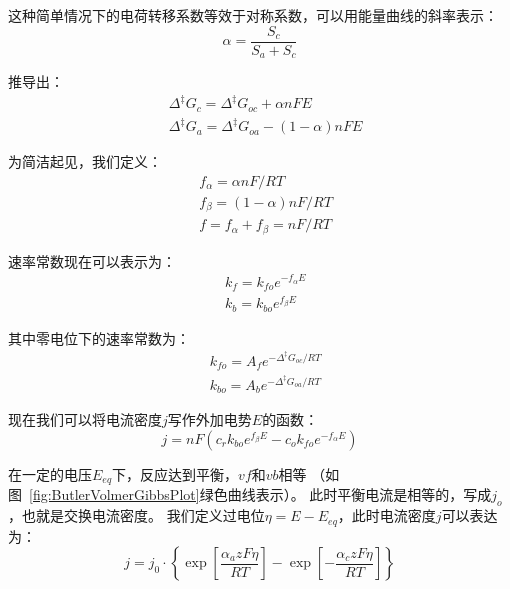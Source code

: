 这种简单情况下的电荷转移系数等效于对称系数，可以用能量曲线的斜率表示：
\begin{equation}
    \alpha=\frac{S_ {c}}{S_ {a} + S_ {c}}
\end{equation}

推导出：
\begin{equation}
    \begin{aligned}
        &\Delta ^{\ddagger }G_{c}=\Delta ^{\ddagger }G_{oc}+\alpha nFE\\
        &\Delta ^{\ddagger }G_{a}=\Delta ^{\ddagger }G_{oa}-(1-\alpha )nFE
    \end{aligned}
\end{equation}

为简洁起见，我们定义：
\begin{equation}
    \begin{aligned}
        &f_{\alpha }=\alpha nF/RT\\
        &f_{\beta }=(1-\alpha )nF/RT\\
        &f=f_{\alpha }+f_{\beta }=nF/RT
    \end{aligned}
\end{equation}

速率常数现在可以表示为：
\begin{equation}
    \begin{aligned}
        &k_{f}=k_{fo}e^{-f_{\alpha }E}\\
        &k_{b}=k_{bo}e^{f_{\beta }E}
    \end{aligned}
\end{equation}

其中零电位下的速率常数为：
\begin{equation}
    \begin{aligned}
        &k_{fo}=A_{f}e^{-\Delta ^{\ddagger }G_{oc}/RT}\\
        &k_{bo}=A_{b}e^{-\Delta ^{\ddagger }G_{oa}/RT}
    \end{aligned}
\end{equation}

现在我们可以将电流密度$j$写作外加电势$E$的函数\cite{CITEREFNewmanThomas-Alyea2004}：
\begin{equation}
    j=nF(c_{r}k_{bo}e^{f_{\beta }E}-c_{o}k_{fo}e^{-f_{\alpha }E})
\end{equation}

在一定的电压$E_{eq}$下，反应达到平衡，$vf$和$vb$相等
（如图~\ref{fig:ButlerVolmerGibbsPlot}绿色曲线表示）。
此时平衡电流是相等的，写成$j_o$，也就是交换电流密度。
我们定义过电位$\eta=E-E_ {eq}$，此时电流密度$j$可以表达为：
\begin{equation}
    j=j_{0}\cdot \left\{\exp \left[{\frac {\alpha _{a}zF\eta }{RT}}\right]-\exp \left[-{\frac {\alpha _{c}zF\eta }{RT}}\right]\right\}
    \label{equation:Butler_Volmer}
\end{equation}

